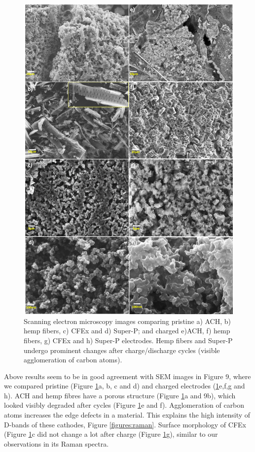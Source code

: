 \documentclass{article}
\begin{document}
\begin{figure}[tbh!]
  \centering
  \includegraphics[width=\textwidth]{figures/SEM}
    \caption{Scanning electron microscopy images comparing pristine a) ACH, b) hemp fibers, c) CFEx and d) Super-P; and charged e)ACH, f) hemp fibers, g) CFEx and h) Super-P electrodes. Hemp fibers and Super-P undergo prominent changes after charge/discharge cycles (visible agglomeration of carbon atoms).}
  \label{figures:SEM}
\end{figure}
Above results seem to be in good agreement with SEM images in Figure 9, where we compared pristine (Figure \ref{figures:SEM}a, b, c and d) and charged electrodes (\ref{figures:SEM}e,f,g and h). ACH and hemp fibres have a porous structure (Figure \ref{figures:SEM}a and 9b), which looked visibly degraded after cycles (Figure \ref{figures:SEM}e and f). Agglomeration of carbon atoms increases the edge defects in a material. This explains the high intensity of D-bands of these cathodes, Figure \ref{figures:raman}. Surface morphology of CFEx (Figure \ref{figures:SEM}c did not change a lot after charge (Figure \ref{figures:SEM}g), similar to our observations in its Raman spectra. 
\end{document}
